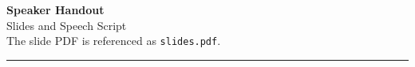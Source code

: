 \documentclass[11pt,a4paper]{article}
\newcommand{\SlidePDF}{slides.pdf}
\newcommand{\DocTitle}{Speaker Handout}
\newcommand{\DocSubtitle}{Slides and Speech Script}
\begin{document}
\begin{center}
  {\LARGE\bfseries \DocTitle}\\[0.4em]
  {\large \DocSubtitle}\\[0.8em]
  {\small The slide PDF is referenced as \texttt{\SlidePDF}.}
\end{center}

\vspace{1em}
\hrule
\vspace{1em}

\end{document}
